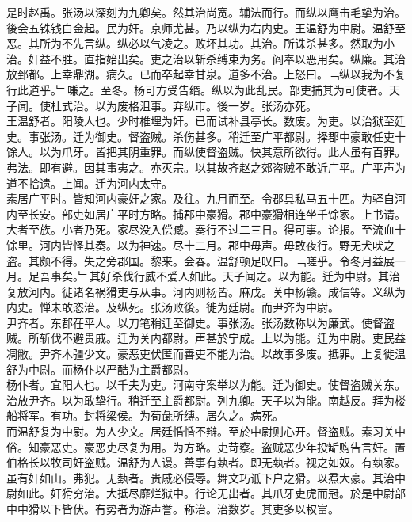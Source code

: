 \documentclass{zhvt-classic}
\begin{document}
\hspace*{2em}是时赵禹。张汤以深刻为九卿矣。然其治尚宽。辅法而行。而纵以鹰击毛挚为治。後会五铢钱白金起。民为奸。京师尤甚。乃以纵为右内史。王温舒为中尉。温舒至恶。其所为不先言纵。纵必以气凌之。败坏其功。其治。所诛杀甚多。然取为小治。奸益不胜。直指始出矣。吏之治以斩杀缚束为务。阎奉以恶用矣。纵廉。其治放郅都。上幸鼎湖。病久。已而卒起幸甘泉。道多不治。上怒曰。﹁纵以我为不复行此道乎。﹂嗛之。至冬。杨可方受告缗。纵以为此乱民。部吏捕其为可使者。天子闻。使杜式治。以为废格沮事。弃纵市。後一岁。张汤亦死。\\
\hspace*{2em}王温舒者。阳陵人也。少时椎埋为奸。已而试补县亭长。数废。为吏。以治狱至廷史。事张汤。迁为御史。督盗贼。杀伤甚多。稍迁至广平都尉。择郡中豪敢任吏十馀人。以为爪牙。皆把其阴重罪。而纵使督盗贼。快其意所欲得。此人虽有百罪。弗法。即有避。因其事夷之。亦灭宗。以其故齐赵之郊盗贼不敢近广平。广平声为道不拾遗。上闻。迁为河内太守。\\
\hspace*{2em}素居广平时。皆知河内豪奸之家。及往。九月而至。令郡具私马五十匹。为驿自河内至长安。部吏如居广平时方略。捕郡中豪猾。郡中豪猾相连坐千馀家。上书请。大者至族。小者乃死。家尽没入偿臧。奏行不过二三日。得可事。论报。至流血十馀里。河内皆怪其奏。以为神速。尽十二月。郡中毋声。毋敢夜行。野无犬吠之盗。其颇不得。失之旁郡国。黎来。会春。温舒顿足叹曰。﹁嗟乎。令冬月益展一月。足吾事矣。﹂其好杀伐行威不爱人如此。天子闻之。以为能。迁为中尉。其治复放河内。徙诸名祸猾吏与从事。河内则杨皆。麻戊。关中杨赣。成信等。义纵为内史。惮未敢恣治。及纵死。张汤败後。徙为廷尉。而尹齐为中尉。\\
\hspace*{2em}尹齐者。东郡茌平人。以刀笔稍迁至御史。事张汤。张汤数称以为廉武。使督盗贼。所斩伐不避贵戚。迁为关内都尉。声甚於宁成。上以为能。迁为中尉。吏民益凋敝。尹齐木彊少文。豪恶吏伏匿而善吏不能为治。以故事多废。抵罪。上复徙温舒为中尉。而杨仆以严酷为主爵都尉。\\
\hspace*{2em}杨仆者。宜阳人也。以千夫为吏。河南守案举以为能。迁为御史。使督盗贼关东。治放尹齐。以为敢挚行。稍迁至主爵都尉。列九卿。天子以为能。南越反。拜为楼船将军。有功。封将梁侯。为荀彘所缚。居久之。病死。\\
\hspace*{2em}而温舒复为中尉。为人少文。居廷惛惛不辩。至於中尉则心开。督盗贼。素习关中俗。知豪恶吏。豪恶吏尽复为用。为方略。吏苛察。盗贼恶少年投缿购告言奸。置伯格长以牧司奸盗贼。温舒为人谩。善事有埶者。即无埶者。视之如奴。有埶家。虽有奸如山。弗犯。无埶者。贵戚必侵辱。舞文巧诋下户之猾。以焄大豪。其治中尉如此。奸猾穷治。大抵尽靡烂狱中。行论无出者。其爪牙吏虎而冠。於是中尉部中中猾以下皆伏。有势者为游声誉。称治。治数岁。其吏多以权富。\\
\end{document}
